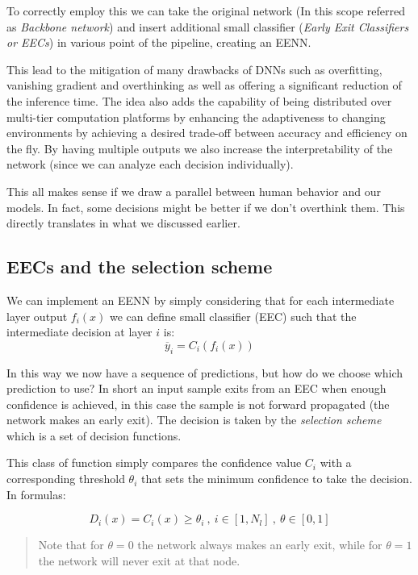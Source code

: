 \documentclass{article}
\begin{document}
    To correctly employ this we can take the original network (In this scope referred as \emph{Backbone network}) and insert additional small classifier (\emph{Early Exit Classifiers or EECs}) in various point of the pipeline, creating an EENN.

    This lead to the mitigation of many drawbacks of DNNs such as overfitting, vanishing gradient and overthinking as well as offering a significant reduction of the inference time. The idea also adds the capability of being distributed over multi-tier computation platforms by 
    enhancing the adaptiveness to changing environments by achieving a desired trade-off between accuracy and efficiency on the fly. By having multiple outputs we also increase the interpretability of the network (since we can analyze each decision individually).

    This all makes sense if we draw a parallel between human behavior and our models. In fact, some decisions might be better if we don't overthink them. This directly translates in what we discussed earlier.
    \subsection{EECs and the selection scheme}
      We can implement an EENN by simply considering that for each intermediate layer output $f_i(x)$ we can define  small classifier (EEC) such that the intermediate decision at layer $i$ is:
      \begin{equation}
        \overline{y}_i = C_i(f_i(x)) 
      \end{equation}

      In this way we now have a sequence of predictions, but how do we choose which prediction to use? In short an input sample exits from an EEC when enough confidence is achieved, in this case the sample is not forward propagated (the network makes an early exit). The decision is taken by the \emph{selection scheme} which is a set of decision functions.

      This class of function simply compares the confidence value $C_i$ with a corresponding threshold $\theta_i$ that sets the minimum confidence to take the decision. In formulas:

      \begin{equation}
        D_i(x) = C_i(x)\geq \theta_i \ , \  i \in [1,N_l] \ , \ \theta \in [0,1]
      \end{equation}

      \begin{quote}
        Note that for $\theta = 0$ the network always makes an early exit, while for $\theta = 1$ the network will never exit at that node.
      \end{quote}
\end{document}
